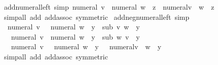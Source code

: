 \begin{isabellebody}
%
\endisadelimdocument
{}\isamarkupfalse%
\ add{\isacharunderscore}{\kern0pt}numeral{\isacharunderscore}{\kern0pt}left\ {\isacharbrackleft}{\kern0pt}simp{\isacharbrackright}{\kern0pt}{\isacharcolon}{\kern0pt}\ {\isachardoublequoteopen}numeral\ v\ {\isacharplus}{\kern0pt}\ {\isacharparenleft}{\kern0pt}numeral\ w\ {\isacharplus}{\kern0pt}\ z{\isacharparenright}{\kern0pt}\ {\isacharequal}{\kern0pt}\ {\isacharparenleft}{\kern0pt}numeral{\isacharparenleft}{\kern0pt}v\ {\isacharplus}{\kern0pt}\ w{\isacharparenright}{\kern0pt}\ {\isacharplus}{\kern0pt}\ z{\isacharparenright}{\kern0pt}{\isachardoublequoteclose}\isanewline
%
\isadelimproof
\ \ %
\endisadelimproof
%
\isatagproof
{}\isamarkupfalse%
\ {\isacharparenleft}{\kern0pt}simp{\isacharunderscore}{\kern0pt}all\ add{\isacharcolon}{\kern0pt}\ add{\isachardot}{\kern0pt}assoc\ {\isacharbrackleft}{\kern0pt}symmetric{\isacharbrackright}{\kern0pt}{\isacharparenright}{\kern0pt}%
\endisatagproof
{\isafoldproof}%
%
\isadelimproof
\isanewline
%
\endisadelimproof
\isanewline
{}\isamarkupfalse%
\ add{\isacharunderscore}{\kern0pt}neg{\isacharunderscore}{\kern0pt}numeral{\isacharunderscore}{\kern0pt}left\ {\isacharbrackleft}{\kern0pt}simp{\isacharbrackright}{\kern0pt}{\isacharcolon}{\kern0pt}\isanewline
\ \ {\isachardoublequoteopen}numeral\ v\ {\isacharplus}{\kern0pt}\ {\isacharparenleft}{\kern0pt}{\isacharminus}{\kern0pt}\ numeral\ w\ {\isacharplus}{\kern0pt}\ y{\isacharparenright}{\kern0pt}\ {\isacharequal}{\kern0pt}\ {\isacharparenleft}{\kern0pt}sub\ v\ w\ {\isacharplus}{\kern0pt}\ y{\isacharparenright}{\kern0pt}{\isachardoublequoteclose}\isanewline
\ \ {\isachardoublequoteopen}{\isacharminus}{\kern0pt}\ numeral\ v\ {\isacharplus}{\kern0pt}\ {\isacharparenleft}{\kern0pt}numeral\ w\ {\isacharplus}{\kern0pt}\ y{\isacharparenright}{\kern0pt}\ {\isacharequal}{\kern0pt}\ {\isacharparenleft}{\kern0pt}sub\ w\ v\ {\isacharplus}{\kern0pt}\ y{\isacharparenright}{\kern0pt}{\isachardoublequoteclose}\isanewline
\ \ {\isachardoublequoteopen}{\isacharminus}{\kern0pt}\ numeral\ v\ {\isacharplus}{\kern0pt}\ {\isacharparenleft}{\kern0pt}{\isacharminus}{\kern0pt}\ numeral\ w\ {\isacharplus}{\kern0pt}\ y{\isacharparenright}{\kern0pt}\ {\isacharequal}{\kern0pt}\ {\isacharparenleft}{\kern0pt}{\isacharminus}{\kern0pt}\ numeral{\isacharparenleft}{\kern0pt}v\ {\isacharplus}{\kern0pt}\ w{\isacharparenright}{\kern0pt}\ {\isacharplus}{\kern0pt}\ y{\isacharparenright}{\kern0pt}{\isachardoublequoteclose}\isanewline
%
\isadelimproof
\ \ %
\endisadelimproof
%
\isatagproof
{}\isamarkupfalse%
\ {\isacharparenleft}{\kern0pt}simp{\isacharunderscore}{\kern0pt}all\ add{\isacharcolon}{\kern0pt}\ add{\isachardot}{\kern0pt}assoc\ {\isacharbrackleft}{\kern0pt}symmetric{\isacharbrackright}{\kern0pt}{\isacharparenright}{\kern0pt}%

\end{isabellebody}
